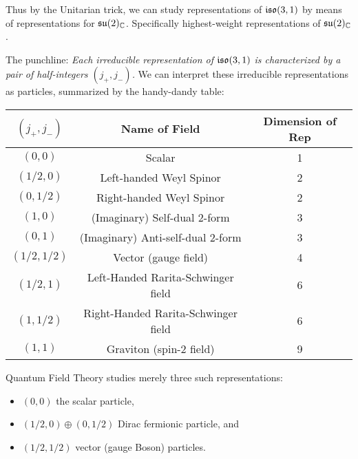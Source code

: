 Thus by the Unitarian trick, we can study representations of $\mathfrak{iso}(3,1)$
by means of representations for $\mathfrak{su}(2)_{\mathbb{C}}$. Specifically
highest-weight representations of $\mathfrak{su}(2)_{\mathbb{C}}$.

\M
The punchline:
\textit{Each irreducible representation of $\mathfrak{iso}(3,1)$
is characterized by a pair of half-integers $(j_{+}, j_{-})$.} We can
interpret these irreducible representations as particles, summarized by
the handy-dandy table:

\begin{center}
\begin{tabular}{c|c|c}
  $(j_{+}, j_{-})$ & Name of Field & Dimension of Rep \\\hline
  $(0, 0)$ &	Scalar  &	1\\
$(1/2, 0)$ & 	Left-handed Weyl Spinor &	2\\
$(0, 1/2)$ &	Right-handed Weyl Spinor &	2\\
$(1, 0)$ &	(Imaginary) Self-dual 2-form &	3\\
$(0, 1)$ &	(Imaginary) Anti-self-dual 2-form &	3\\
$(1/2, 1/2)$ &	Vector (gauge field) &	4\\
$(1/2, 1)$ & 	Left-Handed Rarita-Schwinger field &	6\\
$(1, 1/2)$ &	Right-Handed Rarita-Schwinger field &	6\\
$(1, 1)$ &	Graviton (spin-2 field) &	9
\end{tabular}
\end{center}

Quantum Field Theory studies merely three such representations:
\begin{itemize}
\item $(0,0)$ the scalar particle,
\item $(1/2,0)\oplus(0,1/2)$ Dirac fermionic particle, and
\item $(1/2, 1/2)$ vector (gauge Boson) particles.
\end{itemize}


